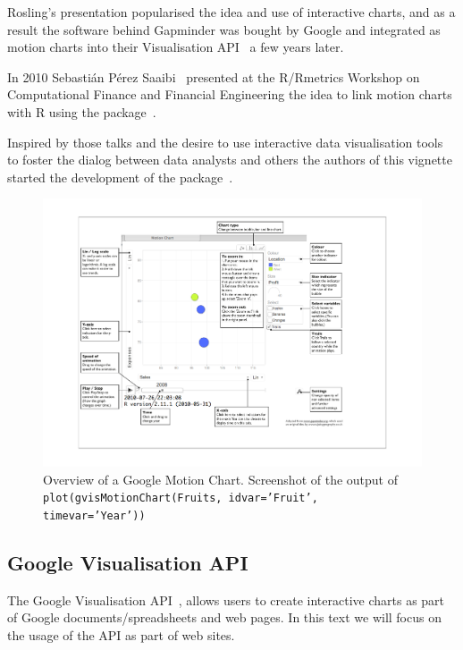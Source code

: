 Rosling's presentation popularised the idea and use of interactive
charts, and as a result the software behind
Gapminder was bought by Google and integrated as motion charts into
their Visualisation API~\cite{GoogleVisApi} a few years later. 

In  2010 Sebasti\'{a}n P\'{e}rez Saaibi~\cite{Saaibi2010} presented at
the R/Rmetrics Workshop on  Computational Finance and Financial
Engineering the idea to link motion charts with R  using the
\rsp package~\cite{Rsp}. 

Inspired by those talks and the desire to use interactive data
visualisation tools to foster the dialog between data analysts and
others the authors of this vignette started the development of the
\googleVis package~\cite{googleVis}.

\begin{figure}[!ht]
\begin{center}
\includegraphics[width=\textwidth]{MotionChart.pdf}
\caption{
  Overview of a Google Motion Chart.  Screenshot of the output of
  \texttt{plot(gvisMotionChart(Fruits, idvar='Fruit', timevar='Year'))}
}\label{MotionChartGUI}
\end{center}
\end{figure}
\clearpage

\subsection{Google Visualisation API}

The Google Visualisation API~\cite{GoogleVisApi}, \cite{GoogleTerms}
allows users to create interactive charts as part of Google
documents/spreadsheets and web pages. In this text we will focus 
on the usage of the API as part of web sites.


